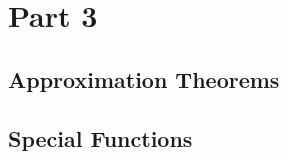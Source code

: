 \documentclass[12pt, a4paper, oneside, openright, titlepage]{book}
\begin{document}
\part{Part 3}

\chapter{Approximation Theorems}




\chapter{Special Functions}








\begin{appendices}


\end{appendices}
\end{document}
